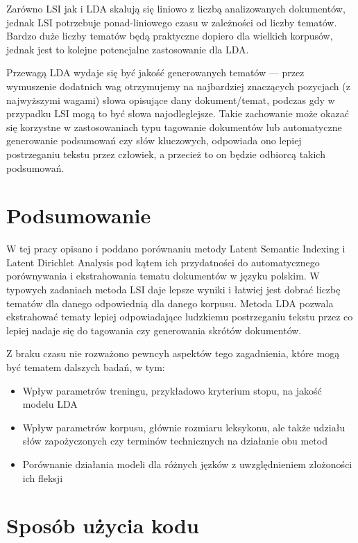 \documentclass[11pt,a4paper]{article}
\begin{document}
Zarówno LSI jak i LDA skalują się liniowo z liczbą analizowanych dokumentów,
jednak LSI potrzebuje ponad-liniowego czasu w zależności od liczby tematów.
Bardzo duże liczby tematów będą praktyczne dopiero dla wielkich korpusów,
jednak jest to kolejne potencjalne zastosowanie dla LDA.

Przewagą LDA wydaje się być jakość generowanych tematów --- przez wymuszenie
dodatnich wag otrzymujemy na najbardziej znaczących pozycjach (z najwyższymi
wagami) słowa opisujące dany dokument/temat, podczas gdy w przypadku LSI mogą
to być słowa najodleglejsze. Takie zachowanie może okazać się korzystne w
zastosowaniach typu tagowanie dokumentów lub automatyczne generowanie
podsumowań czy słów kluczowych, odpowiada ono lepiej postrzeganiu tekstu przez
człowiek, a przecież to on będzie odbiorcą takich podsumowań.

\pagebreak

\section{Podsumowanie}

W tej pracy opisano i poddano porównaniu metody Latent Semantic Indexing i
Latent Dirichlet Analysis pod kątem ich przydatności do automatycznego
porównywania i ekstrahowania tematu dokumentów w języku polskim. W typowych
zadaniach metoda LSI daje lepsze wyniki i łatwiej jest dobrać liczbę tematów
dla danego odpowiednią dla danego korpusu. Metoda LDA pozwala ekstrahować
tematy lepiej odpowiadające ludzkiemu postrzeganiu tekstu przez co lepiej
nadaje się do tagowania czy generowania skrótów dokumentów.

Z braku czasu nie rozważono pewncyh aspektów tego zagadnienia, które mogą być
tematem dalszych badań, w tym:

\begin{itemize}
\item Wpływ parametrów treningu, przykładowo kryterium stopu, na jakość modelu LDA
\item Wpływ parametrów korpusu, głównie rozmiaru leksykonu, ale także udziału słów zapożyczonych czy terminów technicznych na działanie obu metod
\item Porównanie działania modeli dla różnych jęzków z uwzględnieniem złożoności ich fleksji
\end{itemize}

\label{sec:summary}
\pagebreak

\appendix
\section{Sposób użycia kodu}
\label{sec:code}
\end{document}
